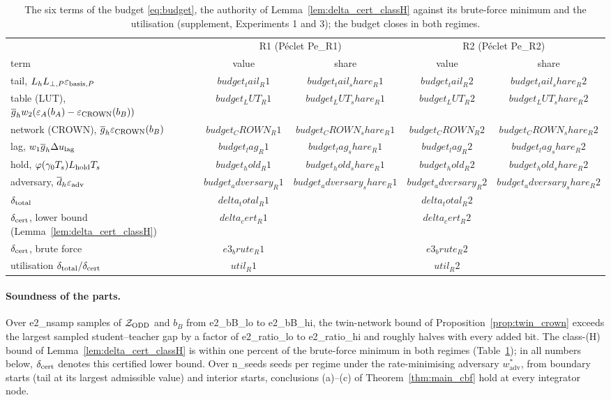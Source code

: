 \begin{table}[t]
{\caption{The six terms of the budget \eqref{eq:budget}, the authority of Lemma~\ref{lem:delta_cert_classH} against its brute-force minimum and the utilisation (supplement, Experiments 1 and 3); the budget closes in both regimes.}\label{tab:budget}}
{\scriptsize
\begin{tabular}{lcccc}
\toprule
& \multicolumn{2}{c}{R1 (P\'eclet {{Pe_R1}})} & \multicolumn{2}{c}{R2 (P\'eclet {{Pe_R2}})} \\
term & value & share & value & share \\
\midrule
tail, $L_hL_{\perp,P}\varepsilon_{\mathrm{basis},P}$ & ${{budget_tail_R1}}$ & ${{budget_tail_share_R1}}$ & ${{budget_tail_R2}}$ & ${{budget_tail_share_R2}}$ \\
table (LUT), $\overline{g}_h w_2(\varepsilon_A(b_A) - \varepsilon_{\mathrm{CROWN}}(b_B))$ & ${{budget_LUT_R1}}$ & ${{budget_LUT_share_R1}}$ & ${{budget_LUT_R2}}$ & ${{budget_LUT_share_R2}}$ \\
network (CROWN), $\overline{g}_h\varepsilon_{\mathrm{CROWN}}(b_B)$ & ${{budget_CROWN_R1}}$ & ${{budget_CROWN_share_R1}}$ & ${{budget_CROWN_R2}}$ & ${{budget_CROWN_share_R2}}$ \\
lag, $w_1\overline{g}_h\Delta u_{\mathrm{lag}}$ & ${{budget_lag_R1}}$ & ${{budget_lag_share_R1}}$ & ${{budget_lag_R2}}$ & ${{budget_lag_share_R2}}$ \\
hold, $\varphi(\gamma_0T_s)L_{\mathrm{hold}} T_s$ & ${{budget_hold_R1}}$ & ${{budget_hold_share_R1}}$ & ${{budget_hold_R2}}$ & ${{budget_hold_share_R2}}$ \\
adversary, $\overline{d}_h\varepsilon_{\mathrm{adv}}$ & ${{budget_adversary_R1}}$ & ${{budget_adversary_share_R1}}$ & ${{budget_adversary_R2}}$ & ${{budget_adversary_share_R2}}$ \\
\midrule
$\delta_{\mathrm{total}}$ & ${{delta_total_R1}}$ & & ${{delta_total_R2}}$ & \\
$\delta_{\mathrm{cert}}$, lower bound (Lemma~\ref{lem:delta_cert_classH}) & ${{delta_cert_R1}}$ & & ${{delta_cert_R2}}$ & \\
$\delta_{\mathrm{cert}}$, brute force & ${{e3_brute_R1}}$ & & ${{e3_brute_R2}}$ & \\
utilisation $\delta_{\mathrm{total}}/\delta_{\mathrm{cert}}$ & ${{util_R1}}$ & & ${{util_R2}}$ & \\
\bottomrule
\end{tabular}}
\end{table}

\paragraph{Soundness of the parts.}
Over {{e2_nsamp}} samples of $\mathcal{Z}_{\mathrm{ODD}}$ and $b_B$ from {{e2_bB_lo}} to {{e2_bB_hi}}, the twin-network bound of Proposition~\ref{prop:twin_crown} exceeds the largest sampled student--teacher gap by a factor of {{e2_ratio_lo}} to {{e2_ratio_hi}} and roughly halves with every added bit. The class-(H) bound of Lemma~\ref{lem:delta_cert_classH} is within one percent of the brute-force minimum in both regimes (Table~\ref{tab:budget}); in all numbers below, $\delta_{\mathrm{cert}}$ denotes this certified lower bound. Over {{n_seeds}} seeds per regime under the rate-minimising adversary $w^*_{\mathrm{adv}}$, from boundary starts (tail at its largest admissible value) and interior starts, conclusions (a)--(c) of Theorem~\ref{thm:main_cbf} hold at every integrator node.

